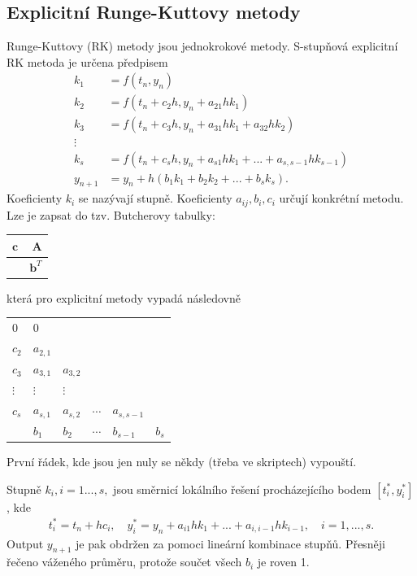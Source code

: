 \subsection{Explicitní Runge-Kuttovy metody}
Runge-Kuttovy (RK) metody jsou jednokrokové metody. S-stupňová explicitní RK metoda je určena předpisem
\begin{align}
k_{1}&= f(t_{n}, y_{n}) \\
k_{2}& = f(t_{n}+c_{2} h, y_{n} + a_{21} h k_{1}) \\
k_{3} &= f(t_{n}+c_{3} h, y_{n} + a_{31} hk_{1} + a_{32}h k_{2}) \\
\vdots& \\
k_{s} & = f(t_{n}+c_{s} h, y_{n} + a_{s1}h k_{1} + ... + a_{s, s-1}h k_{s-1})\\
y_{n+1}&= y_{n} + h(b_{1}k_{1}+b_{2}k_{2} + ...+ b_{s}k_{s}).
\end{align}
Koeficienty $k_{i}$ se nazývají  stupně. Koeficienty $a_{ij}, b_{i}, c_{i}$ určují konkrétní metodu. Lze je zapsat do tzv. Butcherovy tabulky:
\begin{center}  
 \begin{tabular}{r|r}
  $\textbf{c} $ & $\textbf{A} $ \\ \hline
  & $\textbf{b}^{T}$
   \end{tabular}
   \end{center}
   která pro explicitní metody vypadá následovně
   \begin{center}
 \begin{tabular}{l|lllll} 
   $0$      &     $0$        \\
  $ c_{2}$    &  $a_{2,1}$      &         \\
    $c_{3}$    &  $a_{3,1}$      &  $a_{3,2}$       & \\

    $\vdots$      & $\vdots $ & $\vdots$        \\
   $c_{s}$     &  $a_{s,1}$     &  $a_{s,2}$    & $\cdots$ &  $a_{s,s-1}$  &   \\\hline
    &$ b_{1}$        &$ b_{2}$  & $\cdots$   & $b_{s-1}$      & $b_{s} $\\      
  \end{tabular}  
\end{center}
První řádek, kde jsou jen nuly se někdy (třeba ve skriptech) vypouští. 

Stupně $k_{i}, i=1...,s,$ jsou směrnicí lokálního řešení procházejícího bodem $[t_{i}^{*},y_{i}^{*}]$, kde
\begin{align}
t_{i}^{*} = t_{n}+h c_{i}, \quad y_{i}^{*} = y_{n} +  a_{i1}h k_{1} + ... + a_{i, i-1}h k_{i-1}, \quad i=1,...,s.
\end{align}
Output $y_{n+1}$ je pak obdržen za pomoci lineární kombinace stupňů. Přesněji řečeno váženého průměru, protože součet všech $b_{i}$ je roven 1.

